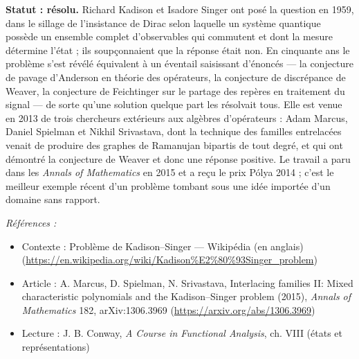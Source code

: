 \documentclass[11pt]{article}
\newenvironment{refs}{\par\small\noindent\emph{Références :}\begin{itemize}\setlength\itemsep{0pt}}{\end{itemize}\normalsize}
\begin{document}
\noindent \textbf{Statut : résolu.} Richard Kadison et Isadore Singer ont posé la question en 1959,
dans le sillage de l'insistance de Dirac selon laquelle un système quantique possède un ensemble complet
d'observables qui commutent et dont la mesure détermine l'état ; ils soupçonnaient que la réponse était non.
En cinquante ans le problème s'est révélé équivalent à un éventail saisissant d'énoncés --- la conjecture de
pavage d'Anderson en théorie des opérateurs, la conjecture de discrépance de Weaver, la conjecture de
Feichtinger sur le partage des repères en traitement du signal --- de sorte qu'une solution quelque part les
résolvait tous. Elle est venue en 2013 de trois chercheurs extérieurs aux algèbres d'opérateurs : Adam
Marcus, Daniel Spielman et Nikhil Srivastava, dont la technique des familles entrelacées venait de produire
des graphes de Ramanujan bipartis de tout degré, et qui ont démontré la conjecture de Weaver et donc une
réponse positive. Le travail a paru dans les \textit{Annals of Mathematics} en 2015 et a reçu le prix Pólya
2014 ; c'est le meilleur exemple récent d'un problème tombant sous une idée importée d'un domaine sans
rapport.

\begin{refs}
\item Contexte : Problème de Kadison--Singer --- Wikipédia (en anglais) (\url{https://en.wikipedia.org/wiki/Kadison%E2%80%93Singer_problem})
\item Article : A. Marcus, D. Spielman, N. Srivastava, \og{} Interlacing families II: Mixed characteristic polynomials and the Kadison--Singer problem \fg{} (2015), \textit{Annals of Mathematics} 182, arXiv:1306.3969 (\url{https://arxiv.org/abs/1306.3969})
\item Lecture : J. B. Conway, \textit{A Course in Functional Analysis}, ch. VIII (états et représentations)
\end{refs}

\bigskip
\end{document}

